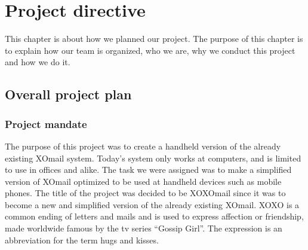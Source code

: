\chapter{Project directive}

This chapter is about how we planned our project. The purpose of this chapter is to explain how our team is organized, who we are, why we conduct this project and how we do it.

\section{Overall project plan}

\subsection{Project mandate}
The purpose of this project was to create a handheld version of the already existing XOmail system. Today’s system only works at computers, and is limited to use in offices and alike. The task we were assigned was to make a simplified version of XOmail optimized to be used at handheld devices such as mobile phones.
\newline
\newline
The title of the project was decided to be XOXOmail since it was to become a new and simplified version of the already existing XOmail. XOXO is a common ending of letters and mails and is used to express affection or friendship, made worldwide famous by the tv series “Gossip Girl”. The expression is an abbreviation for the term hugs and kisses.

